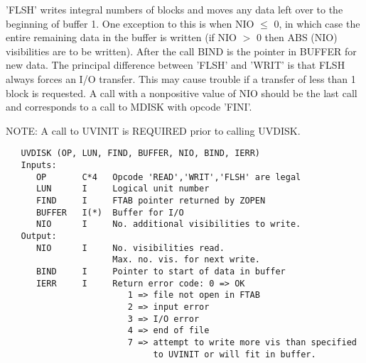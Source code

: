'FLSH' writes integral numbers of blocks and moves any data left over
to the beginning of buffer 1.  One exception to this is when
NIO $\le$ 0, in which case the entire remaining data in the
buffer is written (if NIO $>$ 0 then ABS (NIO) visibilities are to
be written).  After the call BIND is the pointer in BUFFER
for new data.  The principal difference between 'FLSH' and 'WRIT' is
that FLSH always forces an I/O transfer.  This may cause trouble if
a transfer of less than 1 block is requested.  A call with a
nonpositive value of NIO should be the last call and corresponds
to a call to MDISK with opcode 'FINI'.

NOTE:  A call to UVINIT is REQUIRED prior to calling UVDISK.
\begin{verbatim}
   UVDISK (OP, LUN, FIND, BUFFER, NIO, BIND, IERR)
   Inputs:
      OP       C*4   Opcode 'READ','WRIT','FLSH' are legal
      LUN      I     Logical unit number
      FIND     I     FTAB pointer returned by ZOPEN
      BUFFER   I(*)  Buffer for I/O
      NIO      I     No. additional visibilities to write.
   Output:
      NIO      I     No. visibilities read.
                     Max. no. vis. for next write.
      BIND     I     Pointer to start of data in buffer
      IERR     I     Return error code: 0 => OK
                        1 => file not open in FTAB
                        2 => input error
                        3 => I/O error
                        4 => end of file
                        7 => attempt to write more vis than specified
                             to UVINIT or will fit in buffer.
\end{verbatim}
